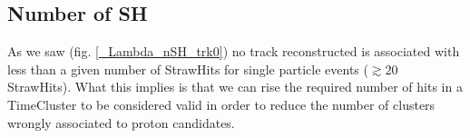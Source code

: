\documentclass[12pt,a4paper,openright, oneside, titlepage]{book} %
\begin{document}
\subsection{Number of SH}
As we saw (fig. \ref{_Lambda_nSH_trk0}) no track reconstructed is associated with less than a given number of StrawHits for single particle events ($\gtrsim 20$ StrawHits). 
What this implies is that we can rise the required number of hits in a TimeCluster to be considered valid in order to reduce the number of clusters wrongly associated to proton candidates.

\end{document}
